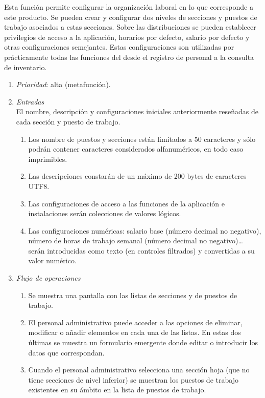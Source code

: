 

	Esta función permite configurar la organización laboral en lo que corresponde a este producto. Se pueden crear y configurar dos niveles de secciones y puestos de trabajo asociados a estas secciones. Sobre las distribuciones se pueden establecer privilegios de acceso a la aplicación, horarios por defecto, salario por defecto y otras configuraciones semejantes. Estas configuraciones son utilizadas por prácticamente todas las funciones del \software desde el registro de personal a la consulta de inventario.

	\begin{enumerate}
		\item \textit{Prioridad}: alta (metafunción).
		\item \textit{Entradas}\\
			El nombre, descripción y configuraciones iniciales anteriormente reseñadas de cada sección y puesto de trabajo.
			\begin{enumerate}
				\item Los nombre de puestos y secciones están limitados a 50 caracteres y sólo podrán contener caracteres considerados alfanuméricos, en todo caso imprimibles.
				\item Las descripciones constarán de un máximo de 200 bytes de caracteres \gls{UTF8}.
				\item Las configuraciones de acceso a las funciones de la aplicación e instalaciones serán colecciones de valores lógicos.
				\item Las configuraciones numéricas: salario base (número decimal no negativo), número de horas de trabajo semanal (número decimal no negativo)\dots{} serán introducidas como texto (en controles filtrados) y convertidas a su valor numérico.
			\end{enumerate}
		\item \textit{Flujo de operaciones}
			\begin{enumerate}
				\item Se muestra una pantalla con las listas de secciones y de puestos de trabajo.
				\item El personal administrativo puede acceder a las opciones de eliminar, modificar o añadir elementos en cada una de las listas. En estas dos últimas se muestra un formulario emergente donde editar o introducir los datos que correspondan.
				\item Cuando el personal administrativo selecciona una sección hoja (que no tiene secciones de nivel inferior) se muestran los puestos de trabajo existentes en su ámbito en la lista de puestos de trabajo.

\end{enumerate}
\end{enumerate}
